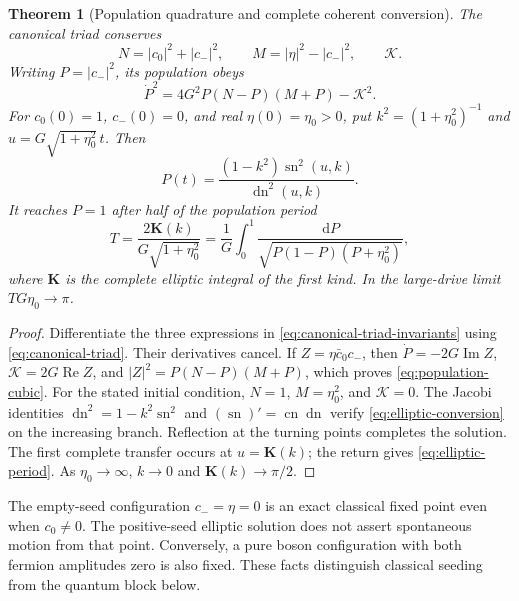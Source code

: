 \documentclass[11pt,a4paper,oneside]{book}
\theoremstyle{plain}
\newtheorem{theorem}{Theorem}[chapter]
\theoremstyle{definition}
\theoremstyle{remark}
\newcommand{\dd}{\mathrm d}
\newcommand{\src}[2]{\cite{#1}}
\begin{document}
\begin{theorem}[Population quadrature and complete coherent conversion]
\label{thm:triad-quadrature}
The canonical triad conserves
\begin{equation}
 N=|c_0|^2+|c_-|^2,\qquad
 M=|\eta|^2-|c_-|^2,\qquad \mathcal K.
 \label{eq:canonical-triad-invariants}
\end{equation}
Writing $P=|c_-|^2$, its population obeys
\begin{equation}
 \dot P^2=4G^2P(N-P)(M+P)-\mathcal K^2.
 \label{eq:population-cubic}
\end{equation}
For $c_0(0)=1$, $c_-(0)=0$, and real $\eta(0)=\eta_0>0$, put
$k^2=(1+\eta_0^2)^{-1}$ and $u=G\sqrt{1+\eta_0^2}\,t$.  Then
\begin{equation}
 P(t)=\frac{(1-k^2)\operatorname{sn}^2(u,k)}
                      {\operatorname{dn}^2(u,k)}.
 \label{eq:elliptic-conversion}
\end{equation}
It reaches $P=1$ after half of the population period
\begin{equation}
 T=\frac{2\mathbf K(k)}{G\sqrt{1+\eta_0^2}}
  =\frac1G\int_0^1\frac{\dd P}
                  {\sqrt{P(1-P)(P+\eta_0^2)}},
 \label{eq:elliptic-period}
\end{equation}
where $\mathbf K$ is the complete elliptic integral of the first kind.
In the large-drive limit $TG\eta_0\to\pi$.
\end{theorem}
\begin{proof}
Differentiate the three expressions in
\eqref{eq:canonical-triad-invariants} using
\eqref{eq:canonical-triad}.  Their derivatives cancel.  If
$Z=\eta\bar c_0c_-$, then
$\dot P=-2G\operatorname{Im}Z$, $\mathcal K=2G\operatorname{Re}Z$, and
$|Z|^2=P(N-P)(M+P)$, which proves \eqref{eq:population-cubic}.
For the stated initial condition, $N=1$, $M=\eta_0^2$, and
$\mathcal K=0$.  The Jacobi identities
$\operatorname{dn}^2=1-k^2\operatorname{sn}^2$ and
$(\operatorname{sn})'=\operatorname{cn}\operatorname{dn}$ verify
\eqref{eq:elliptic-conversion} on the increasing branch.  Reflection at
the turning points completes the solution.  The first complete transfer
occurs at $u=\mathbf K(k)$; the return gives
\eqref{eq:elliptic-period}.  As $\eta_0\to\infty$, $k\to0$ and
$\mathbf K(k)\to\pi/2$.
\end{proof}
\src{R20}{thm:v20v29-quadrature,thm:v20v29-elliptic}

The empty-seed configuration $c_-=\eta=0$ is an exact classical fixed
point even when $c_0\ne0$.  The positive-seed elliptic solution does not
assert spontaneous motion from that point.  Conversely, a pure boson
configuration with both fermion amplitudes zero is also fixed.  These
facts distinguish classical seeding from the quantum block below.
\end{document}
